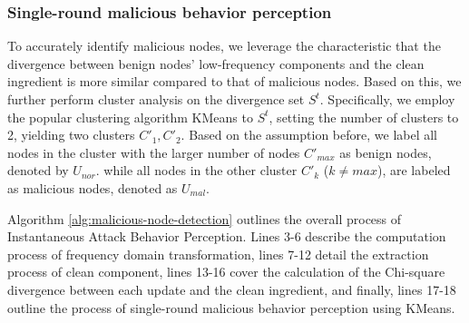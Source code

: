 \documentclass[lettersize,journal]{IEEEtran}
\begin{document}

\subsubsection{Single-round malicious behavior perception}
To accurately identify malicious nodes, we leverage the characteristic that the divergence between benign nodes' low-frequency components and the clean ingredient is more similar compared to that of malicious nodes. Based on this, we further perform cluster analysis on the divergence set \(S^t\). Specifically, we employ the popular clustering algorithm KMeans \cite{wan2023four} to \(S^t\), setting the number of clusters to 2, yielding two clusters \(C'_1, C'_2\). Based on the assumption before,  we label all nodes in the cluster with the larger number of nodes \(C'_{max}\) as benign nodes, denoted by \(U_{nor}\). while all nodes in the other cluster \(C'_k\) (\(k \neq {max}\)), are labeled as malicious nodes, denoted as \(U_{mal}\).

Algorithm \ref{alg:malicious-node-detection} outlines the overall process of Instantaneous Attack Behavior Perception. 
Lines 3-6 describe the computation process of frequency domain transformation, lines 7-12 detail the extraction process of clean component, lines 13-16 cover the calculation of the Chi-square divergence between each update and the clean ingredient, and finally, lines 17-18 outline the process of single-round malicious behavior perception using KMeans.
\end{document}
